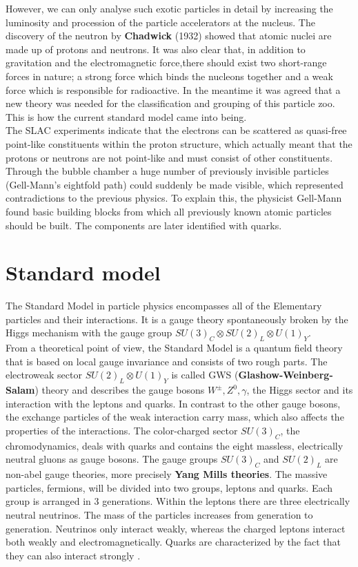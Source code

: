 However, we can only analyse such exotic particles in detail by increasing the luminosity and procession of the particle accelerators at the nucleus. 
The discovery of the neutron by \textbf{Chadwick} (1932) showed that atomic nuclei are made up of protons and neutrons. It was also clear that, in addition to gravitation and the electromagnetic force,there should exist two short-range forces in nature; a strong force which binds the nucleons together and a weak force which is responsible for radioactive.
In the meantime it was agreed that a new theory was needed for the classification and grouping of this particle zoo. This is how the current standard model came into being.\\
The SLAC experiments indicate that the electrons can be scattered as quasi-free point-like constituents within the proton structure, which actually meant that the protons or neutrons are not point-like and must consist of other constituents. Through the bubble chamber a huge number of previously invisible particles (Gell-Mann's eightfold path) could suddenly be made visible, which represented contradictions to the previous physics. To explain this, the physicist Gell-Mann found basic building blocks from which all previously known atomic particles should be built. The components are later identified with quarks. 
\pagebreak
\section{Standard model}
The Standard Model in particle physics encompasses all of the
Elementary particles and their interactions. It is a gauge theory spontaneously broken by the Higgs mechanism with the gauge group $ SU(3)_C \otimes SU(2)_L \otimes U(1)_Y $.\\
From a theoretical point of view, the Standard Model is a quantum field theory that is based on local gauge invariance and consists of two rough parts. The electroweak sector $ SU(2)_L \otimes U(1)_Y $ is called GWS (\textbf{Glashow-Weinberg-Salam}) theory and describes the gauge bosons $ W^{\pm}, Z^0, \gamma $, the Higgs sector and its interaction with the leptons and quarks. In contrast to the other gauge bosons, the exchange particles of the weak interaction carry mass, which also affects the properties of the interactions. The color-charged sector $ SU(3)_C $, the chromodynamics, deals with quarks and contains the eight massless, electrically neutral gluons as gauge bosons. The gauge groups $SU(3)_C$ and $SU(2)_L$ are non-abel gauge theories, more precisely \textbf{Yang Mills theories}.
The massive particles, fermions, will be divided into two groups, leptons and quarks. Each group is arranged in 3 generations. Within the leptons there are three electrically neutral neutrinos. The mass of the particles increases from generation to generation. Neutrinos only interact weakly, whereas the charged leptons interact both weakly and electromagnetically. Quarks are characterized by the fact that they can also interact strongly \cite{edelhaeuser2016tutorium}. 


